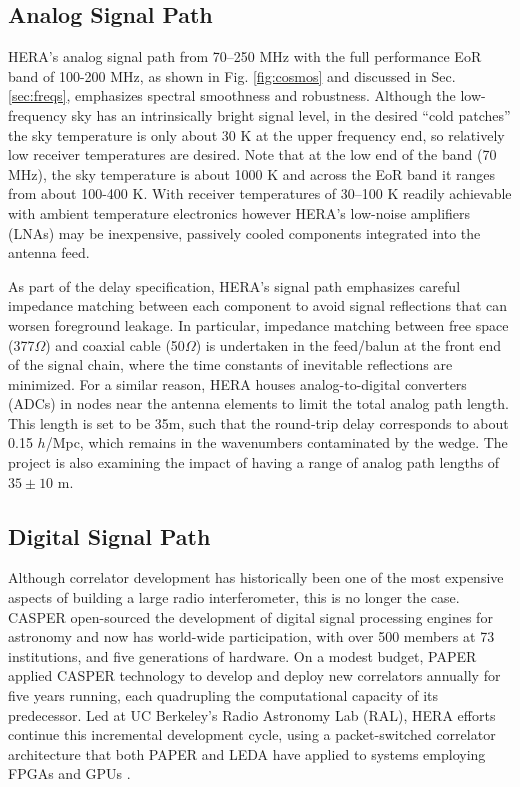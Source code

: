 \documentclass[preprint,11pt]{aastex}
\newcommand{\Mycitep}[1]{\citep{#1}}
\begin{document}
\subsection{Analog Signal Path}
HERA's analog signal path from 70--250 MHz with the full performance EoR band of 100-200 MHz, as shown in Fig. \ref{fig:cosmos} and discussed in Sec. \ref{sec:freqs}, emphasizes spectral smoothness and robustness.  Although the low-frequency sky has an intrinsically bright signal level, in the desired ``cold patches'' the sky temperature is only about 30 K at the upper frequency end, so relatively low receiver temperatures are desired.  Note that at the low end of the band (70 MHz), the sky temperature is about 1000 K and across the EoR band it ranges from about 100-400 K.
With receiver temperatures of 30--100 K readily achievable with ambient temperature electronics however
HERA's low-noise amplifiers (LNAs) may be inexpensive, passively cooled components integrated into the
antenna feed.  

As part of the delay specification,
HERA's signal path emphasizes careful impedance matching between each component to avoid signal reflections that can worsen foreground leakage.
In particular, impedance matching between free space (377$\Omega$) and coaxial cable (50$\Omega$) is undertaken
in the feed/balun at the front end of the signal chain, where the time constants of inevitable reflections are
minimized.  For a similar reason, HERA houses analog-to-digital converters (ADCs) in nodes near the antenna elements
to limit the total analog path length.  This length is set to be 35m, such that the round-trip delay corresponds to about 0.15 $h$/Mpc, which remains in the wavenumbers  contaminated by the wedge.  The project is also examining the impact of having a range of analog path lengths of $35\pm10$ m.



\subsection{Digital Signal Path}
\label{sec:digital}

\noindent Although correlator development has historically been one of the most 
expensive aspects of building a large radio interferometer, this is no longer the case.
CASPER \Mycitep{parsons_et_al2006}
open-sourced the development of digital signal processing engines for astronomy and
now has world-wide participation,
with over 500 members at 73 institutions, and 
five generations of hardware.
On a modest budget, PAPER applied CASPER technology to develop and deploy new correlators
annually for five years running, each quadrupling the computational capacity of its predecessor.
Led at UC Berkeley's Radio Astronomy Lab (RAL),
HERA efforts continue this incremental development cycle, using a packet-switched
correlator architecture \Mycitep{parsons_et_al2008} that both PAPER and LEDA have
applied to systems employing FPGAs and GPUs \citep{clark_et_al2011}.
\end{document}
